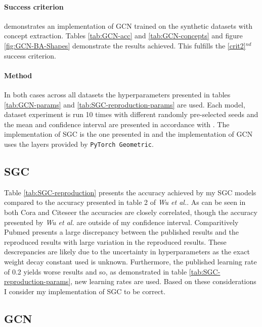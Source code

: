 \paragraph{Success criterion}
 demonstrates an implementation of GCN trained on the synthetic datasets with concept extraction.
Tables \ref{tab:GCN-acc} and \ref{tab:GCN-concepts} and figure \ref{fig:GCN-BA-Shapes} demonstrate the results achieved.
This fulfills the \ref{crit2}$^{nd}$ success criterion.

\paragraph{Method}
In both cases across all datasets the hyperparameters presented in tables \ref{tab:GCN-params} and \ref{tab:SGC-reproduction-params} are used.
Each model, dataset experiment is run 10 times with different randomly pre-selected seeds and the mean and confidence interval are presented in accordance with .
The implementation of SGC is the one presented in  and the implementation of GCN uses the layers provided by \texttt{PyTorch Geometric}\cite{Fey/Lenssen/2019}.

\subsection{SGC}


Table \ref{tab:SGC-reproduction} presents the accuracy achieved by my SGC models compared to the accuracy presented in table 2 of \textit{Wu et al.}\cite{wu2019simplifying}.
As can be seen in both Cora and Citeseer the accuracies are closely correlated, though the accuracy presented by \textit{Wu et al.} are outside of my confidence interval.
Comparitively Pubmed presents a large discrepancy between the published results and the reproduced results with large variation in the reproduced results.
These descrepancies are likely due to the uncertainty in hyperparameters as the exact weight decay constant used is unknown.
Furthermore, the published learning rate of 0.2 yields worse results and so, as demonstrated in table \ref{tab:SGC-reproduction-params}, new learning rates are used.
Based on these considerations I consider my implementation of SGC to be correct.

\subsection{GCN}
\label{sec:GCN-reproduction}
